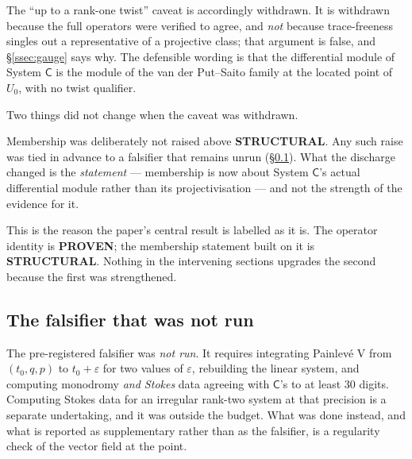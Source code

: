 \begin{remark}
The ``up to a rank-one twist'' caveat is accordingly withdrawn. It is withdrawn
because the full operators were verified to agree, and \emph{not} because
trace-freeness singles out a representative of a projective class; that
argument is false, and \S\ref{ssec:gauge} says why. The defensible wording is
that the differential module of System $\mathsf C$ is the module of the van der
Put--Saito family at the located point of $U_0$, with no twist qualifier.
\end{remark}

Two things did not change when the caveat was withdrawn.

\begin{remark}
Membership was deliberately not raised above \textbf{STRUCTURAL}. Any such
raise was tied in advance to a falsifier that remains unrun
(\S\ref{ssec:unrun}). What the discharge changed is the \emph{statement} ---
membership is now about System $\mathsf C$'s actual differential module rather
than its projectivisation --- and not the strength of the evidence for it.
\end{remark}

This is the reason the paper's central result is labelled as it is. The
operator identity is \textbf{PROVEN}; the membership statement built on it is
\textbf{STRUCTURAL}. Nothing in the intervening sections upgrades the second
because the first was strengthened.

\subsection{The falsifier that was not run}\label{ssec:unrun}

\begin{remark}
The pre-registered falsifier was \emph{not run}. It requires integrating
Painlev\'e V from $(t_0,q,p)$ to $t_0+\varepsilon$ for two values of
$\varepsilon$, rebuilding the linear system, and computing monodromy
\emph{and Stokes} data agreeing with $\mathsf C$'s to at least $30$ digits.
Computing Stokes data for an irregular rank-two system at that precision is a
separate undertaking, and it was outside the budget. What was done instead, and
what is reported as supplementary rather than as the falsifier, is a regularity
check of the vector field at the point.
\end{remark}

